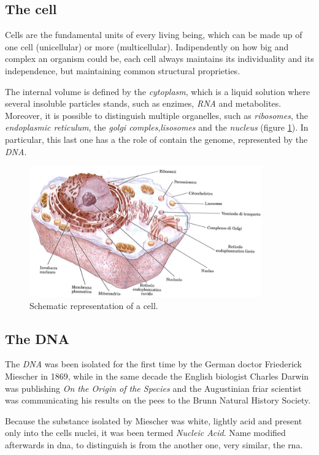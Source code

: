 \subsection{The cell}
\label{sec:cell}
Cells are the fundamental units of every living being, which can be made up of one cell (unicellular) or more (multicellular).
Indipendently on how big and complex an organism could be, each cell always maintains its individuality and its independence, but maintaining common structural proprieties.

The internal volume is defined by the \textit{cytoplasm}, which is a liquid solution where several insoluble particles stands, such as enzimes, \textit{RNA} and metabolites.
Moreover, it is possible to distinguish multiple organelles, such as \textit{ribosomes}, the \textit{endoplasmic reticulum}, the \textit{golgi comples},\textit{lisosomes} and the \textit{nucleus} (figure \ref{fig:cell}).
In particular, this last one has a the role of contain the genome, represented by the \textit{DNA}.

\begin{figure}[h]
\centering
\includegraphics[width=10cm, keepaspectratio]{img/intro/cell.png}
\caption[The Cell]{Schematic representation of a cell.}
\label{fig:cell}
\end{figure}

\subsection{The DNA}
\label{sec:genica}
The \textit{DNA} was been isolated for the first time by the German doctor Friederick Miescher in 1869, while in the same decade the English biologist Charles Darwin was publishing \textit{On the Origin of the Species} and the  Augustinian friar scientist was communicating his results on the pees to the Brunn Natural History Society.

Because the substance isolated by Miescher was white, lightly acid and present only into the cells nuclei, it was been termed \textit{Nucleic Acid}.
Name modified afterwards in \gls{dna}, to distinguish is from the another one, very similar, the \gls{rna}.

